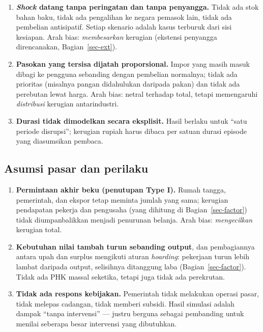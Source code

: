 \documentclass[
  manuscript=article,
  layout=publish,
  year=2026,
  volume=1,
]{den}
\providecommand{\tightlist}{%
  \setlength{\itemsep}{0pt}\setlength{\parskip}{0pt}}
\begin{document}
\begin{enumerate}
\def\labelenumi{\arabic{enumi}.}
\setcounter{enumi}{4}
\tightlist
\item
  \textbf{\emph{Shock} datang tanpa peringatan dan tanpa penyangga.}
  Tidak ada stok bahan baku, tidak ada pengalihan ke negara pemasok
  lain, tidak ada pembelian antisipatif. Setiap skenario adalah kasus
  terburuk dari sisi kesiapan. Arah bias: \emph{membesarkan} kerugian
  (ekstensi penyangga direncanakan, Bagian~\ref{sec-ext}).
\item
  \textbf{Pasokan yang tersisa dijatah proporsional.} Impor yang masih
  masuk dibagi ke pengguna sebanding dengan pembelian normalnya; tidak
  ada prioritas (misalnya pangan didahulukan daripada pakan) dan tidak
  ada perebutan lewat harga. Arah bias: netral terhadap total, tetapi
  memengaruhi \emph{distribusi} kerugian antarindustri.
\item
  \textbf{Durasi tidak dimodelkan secara eksplisit.} Hasil berlaku untuk
  ``satu periode disrupsi''; kerugian rupiah harus dibaca per satuan
  durasi episode yang diasumsikan pembaca.
\end{enumerate}

\subsection{Asumsi pasar dan perilaku}\label{asumsi-pasar-dan-perilaku}

\begin{enumerate}
\def\labelenumi{\arabic{enumi}.}
\setcounter{enumi}{7}
\tightlist
\item
  \textbf{Permintaan akhir beku (penutupan Type I).} Rumah tangga,
  pemerintah, dan ekspor tetap meminta jumlah yang sama; kerugian
  pendapatan pekerja dan pengusaha (yang dihitung di
  Bagian~\ref{sec-factor}) tidak diumpanbalikkan menjadi penurunan
  belanja. Arah bias: \emph{mengecilkan} kerugian total.
\item
  \textbf{Kebutuhan nilai tambah turun sebanding output}, dan
  pembagiannya antara upah dan surplus mengikuti aturan \emph{hoarding}:
  pekerjaan turun lebih lambat daripada output, selisihnya ditanggung
  laba (Bagian~\ref{sec-factor}). Tidak ada PHK massal seketika, tetapi
  juga tidak ada perekrutan.
\item
  \textbf{Tidak ada respons kebijakan.} Pemerintah tidak melakukan
  operasi pasar, tidak melepas cadangan, tidak memberi subsidi. Hasil
  simulasi adalah dampak ``tanpa intervensi'' --- justru berguna sebagai
  pembanding untuk menilai seberapa besar intervensi yang dibutuhkan.
\end{enumerate}
\end{document}
